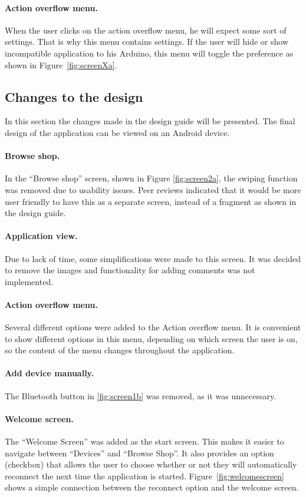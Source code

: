 	\paragraph{Action overflow menu.}
	When the user clicks on the action overflow menu, he will expect some sort of settings. That is why this menu contains settings. If the user will hide or show incompatible application to his Arduino, this menu will toggle the preference as shown in Figure~\ref{fig:screenXa}.

	\subsection{Changes to the design}
	\label{designchanges}
	In this section the changes made in the design guide will be presented. The final design of the application can be viewed on an Android device.

	\paragraph{Browse shop.}
	In the ``Browse shop'' screen, shown in Figure \ref{fig:screen2a}, the swiping function was removed due to usability issues. Peer reviews indicated that it would be more user friendly to have this as a separate screen, instead of a fragment as shown in the design guide.
	
	\paragraph{Application view.}
	Due to lack of time, some simplifications were made to this screen. It was decided to remove the images and functionality for adding comments was not implemented. 
	
	\paragraph{Action overflow menu.}
	Several different options were added to the Action overflow menu. It is convenient to show different options in this menu, depending on which screen the user is on, so the content of the menu changes throughout the application.

	\paragraph{Add device manually.}
	The Bluetooth button in \ref{fig:screen1b} was removed, as it was unnecessary.

	\paragraph{Welcome screen.}
	The ``Welcome Screen'' was added as the start screen. This makes it easier to navigate between ``Devices'' and ``Browse Shop''. It also provides an option (checkbox) that allows the user to choose whether or not they will automatically reconnect the next time the application is started. Figure~\ref{fig:welcomescreen} shows a simple connection between the reconnect option and the welcome screen.

